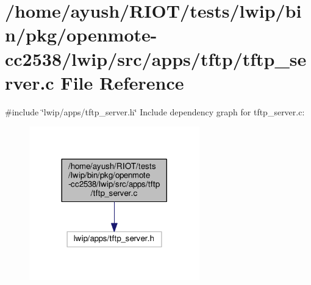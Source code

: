 \hypertarget{openmote-cc2538_2lwip_2src_2apps_2tftp_2tftp__server_8c}{}\section{/home/ayush/\+R\+I\+O\+T/tests/lwip/bin/pkg/openmote-\/cc2538/lwip/src/apps/tftp/tftp\+\_\+server.c File Reference}
\label{openmote-cc2538_2lwip_2src_2apps_2tftp_2tftp__server_8c}
{\ttfamily \#include \char`\"{}lwip/apps/tftp\+\_\+server.\+h\char`\"{}}\newline
Include dependency graph for tftp\+\_\+server.\+c\+:
\nopagebreak
\begin{figure}[H]
\begin{center}
\leavevmode
\includegraphics[width=209pt]{openmote-cc2538_2lwip_2src_2apps_2tftp_2tftp__server_8c__incl}
\end{center}
\end{figure}
